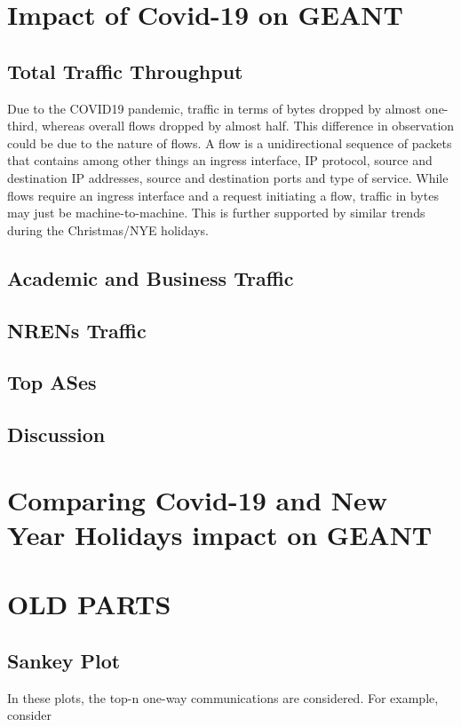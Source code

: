 \documentclass[10pt, journal, letterpaper]{IEEEtran}
\begin{document}
\section{Impact of Covid-19 on GEANT}

\subsection{Total Traffic Throughput}
Due to the COVID19 pandemic, traffic in terms of bytes dropped by almost one-third, whereas overall flows dropped by almost half. This difference in observation could be due to the nature of flows. A flow is a unidirectional sequence of packets that contains among other things an ingress interface, IP protocol, source and destination IP addresses, source and destination ports and type of service. While flows require an ingress interface and a request initiating a flow, traffic in bytes may just be machine-to-machine. This is further supported by similar trends during the Christmas/NYE holidays.

\subsection{Academic and Business Traffic}

\subsection{NRENs Traffic}

\subsection{Top ASes}

\subsection{Discussion}

\section{Comparing Covid-19 and New Year Holidays impact on GEANT}




\section{OLD PARTS}
\subsection{Sankey Plot}
In these plots, the top-n one-way communications are considered. For example, consider
\end{document}
